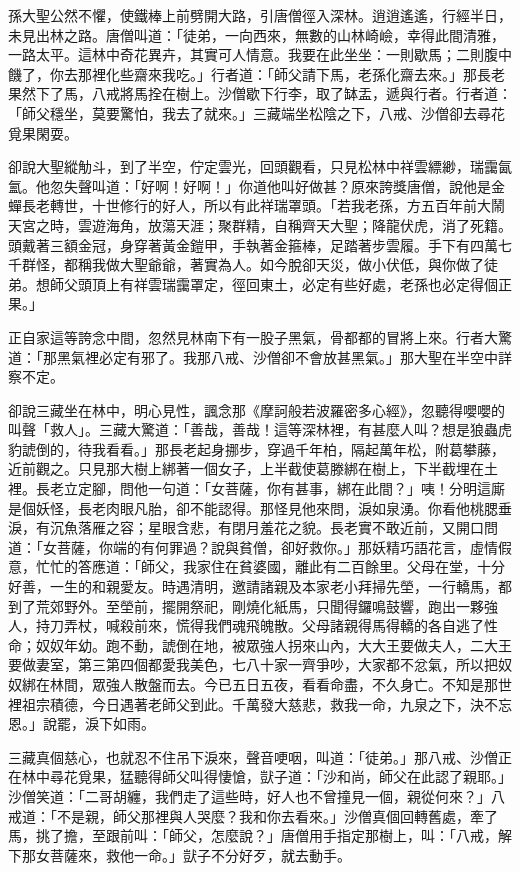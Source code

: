 孫大聖公然不懼，使鐵棒上前劈開大路，引唐僧徑入深林。逍逍遙遙，行經半日，未見出林之路。唐僧叫道：「徒弟，一向西來，無數的山林崎嶮，幸得此間清雅，一路太平。這林中奇花異卉，其實可人情意。我要在此坐坐：一則歇馬；二則腹中饑了，你去那裡化些齋來我吃。」行者道：「師父請下馬，老孫化齋去來。」那長老果然下了馬，八戒將馬拴在樹上。沙僧歇下行李，取了缽盂，遞與行者。行者道：「師父穩坐，莫要驚怕，我去了就來。」三藏端坐松陰之下，八戒、沙僧卻去尋花覓果閑耍。

卻說大聖縱觔斗，到了半空，佇定雲光，回頭觀看，只見松林中祥雲縹緲，瑞靄氤氳。他忽失聲叫道：「好啊！好啊！」你道他叫好做甚？原來誇獎唐僧，說他是金蟬長老轉世，十世修行的好人，所以有此祥瑞罩頭。「若我老孫，方五百年前大鬧天宮之時，雲遊海角，放蕩天涯；聚群精，自稱齊天大聖；降龍伏虎，消了死籍。頭戴著三額金冠，身穿著黃金鎧甲，手執著金箍棒，足踏著步雲履。手下有四萬七千群怪，都稱我做大聖爺爺，著實為人。如今脫卻天災，做小伏低，與你做了徒弟。想師父頭頂上有祥雲瑞靄罩定，徑回東土，必定有些好處，老孫也必定得個正果。」

正自家這等誇念中間，忽然見林南下有一股子黑氣，骨都都的冒將上來。行者大驚道：「那黑氣裡必定有邪了。我那八戒、沙僧卻不會放甚黑氣。」那大聖在半空中詳察不定。

卻說三藏坐在林中，明心見性，諷念那《摩訶般若波羅密多心經》，忽聽得嚶嚶的叫聲「救人」。三藏大驚道：「善哉，善哉！這等深林裡，有甚麼人叫？想是狼蟲虎豹諕倒的，待我看看。」那長老起身挪步，穿過千年柏，隔起萬年松，附葛攀藤，近前觀之。只見那大樹上綁著一個女子，上半截使葛滕綁在樹上，下半截埋在土裡。長老立定腳，問他一句道：「女菩薩，你有甚事，綁在此間？」咦！分明這廝是個妖怪，長老肉眼凡胎，卻不能認得。那怪見他來問，淚如泉湧。你看他桃腮垂淚，有沉魚落雁之容；星眼含悲，有閉月羞花之貌。長老實不敢近前，又開口問道：「女菩薩，你端的有何罪過？說與貧僧，卻好救你。」那妖精巧語花言，虛情假意，忙忙的答應道：「師父，我家住在貧婆國，離此有二百餘里。父母在堂，十分好善，一生的和親愛友。時遇清明，邀請諸親及本家老小拜掃先塋，一行轎馬，都到了荒郊野外。至塋前，擺開祭祀，剛燒化紙馬，只聞得鑼鳴鼓響，跑出一夥強人，持刀弄杖，喊殺前來，慌得我們魂飛魄散。父母諸親得馬得轎的各自逃了性命；奴奴年幼。跑不動，諕倒在地，被眾強人拐來山內，大大王要做夫人，二大王要做妻室，第三第四個都愛我美色，七八十家一齊爭吵，大家都不忿氣，所以把奴奴綁在林間，眾強人散盤而去。今已五日五夜，看看命盡，不久身亡。不知是那世裡祖宗積德，今日遇著老師父到此。千萬發大慈悲，救我一命，九泉之下，決不忘恩。」說罷，淚下如雨。

三藏真個慈心，也就忍不住吊下淚來，聲音哽咽，叫道：「徒弟。」那八戒、沙僧正在林中尋花覓果，猛聽得師父叫得悽愴，獃子道：「沙和尚，師父在此認了親耶。」沙僧笑道：「二哥胡纏，我們走了這些時，好人也不曾撞見一個，親從何來？」八戒道：「不是親，師父那裡與人哭麼？我和你去看來。」沙僧真個回轉舊處，牽了馬，挑了擔，至跟前叫：「師父，怎麼說？」唐僧用手指定那樹上，叫：「八戒，解下那女菩薩來，救他一命。」獃子不分好歹，就去動手。

